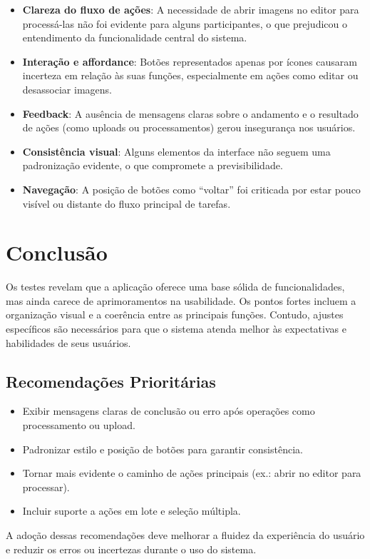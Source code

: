 \begin{itemize}
    \item \textbf{Clareza do fluxo de ações}: A necessidade de abrir imagens no editor para processá-las não foi evidente para alguns participantes, o que prejudicou o entendimento da funcionalidade central do sistema.
    
    \item \textbf{Interação e affordance}: Botões representados apenas por ícones causaram incerteza em relação às suas funções, especialmente em ações como editar ou desassociar imagens.

    \item \textbf{Feedback}: A ausência de mensagens claras sobre o andamento e o resultado de ações (como uploads ou processamentos) gerou insegurança nos usuários.

    \item \textbf{Consistência visual}: Alguns elementos da interface não seguem uma padronização evidente, o que compromete a previsibilidade.

    \item \textbf{Navegação}: A posição de botões como “voltar” foi criticada por estar pouco visível ou distante do fluxo principal de tarefas.
\end{itemize}

\section{Conclusão}

Os testes revelam que a aplicação oferece uma base sólida de funcionalidades, mas ainda carece de aprimoramentos na usabilidade. Os pontos fortes incluem a organização visual e a coerência entre as principais funções. Contudo, ajustes específicos são necessários para que o sistema atenda melhor às expectativas e habilidades de seus usuários.

\subsection*{Recomendações Prioritárias}

\begin{itemize}
    \item Exibir mensagens claras de conclusão ou erro após operações como processamento ou upload.
    \item Padronizar estilo e posição de botões para garantir consistência.
    \item Tornar mais evidente o caminho de ações principais (ex.: abrir no editor para processar).
    \item Incluir suporte a ações em lote e seleção múltipla.
\end{itemize}

A adoção dessas recomendações deve melhorar a fluidez da experiência do usuário e reduzir os erros ou incertezas durante o uso do sistema.
